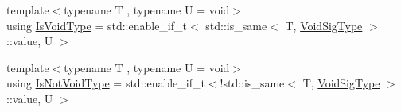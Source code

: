 \begin{DoxyCompactItemize}
\item 
{\footnotesize template$<$typename T , typename U  = void$>$ }\\using \hyperlink{structvt_1_1pipe_1_1callback_1_1_callback_bcast_a3ca08c23824cfac76b837311a1d2c929}{Is\+Void\+Type} = std\+::enable\+\_\+if\+\_\+t$<$ std\+::is\+\_\+same$<$ T, \hyperlink{structvt_1_1pipe_1_1callback_1_1_callback_bcast_a64032b57b71c27653b93b3e13bf38145}{Void\+Sig\+Type} $>$\+::value, U $>$
\item 
{\footnotesize template$<$typename T , typename U  = void$>$ }\\using \hyperlink{structvt_1_1pipe_1_1callback_1_1_callback_bcast_a3f5efa2edf7f4c47fe047e086e63a477}{Is\+Not\+Void\+Type} = std\+::enable\+\_\+if\+\_\+t$<$!std\+::is\+\_\+same$<$ T, \hyperlink{structvt_1_1pipe_1_1callback_1_1_callback_bcast_a64032b57b71c27653b93b3e13bf38145}{Void\+Sig\+Type} $>$\+::value, U $>$
\end{DoxyCompactItemize}
